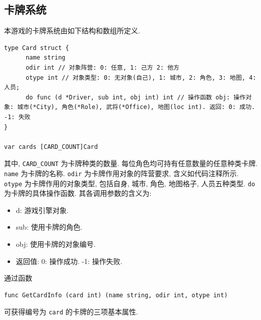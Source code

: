 \documentclass[UTF8, zihao=-4]{ctexart} %
\newcommand{\lcode}{\lstinline} % 段内插入代码
\begin{document}
\subsection{卡牌系统}
\label{s_card}
本游戏的卡牌系统由如下结构和数组所定义.
\begin{lstlisting}
type Card struct {
      name string
      odir int // 对象阵营: 0: 任意, 1: 己方 2: 他方
      otype int // 对象类型: 0: 无对象(自己), 1: 城市, 2: 角色, 3: 地图, 4: 人员;
      do func (d *Driver, sub int, obj int) int // 操作函数 obj: 操作对象: 城市(*City), 角色(*Role), 武将(*Office), 地图(loc int). 返回: 0: 成功. -1: 失败
}

var cards [CARD_COUNT]Card
\end{lstlisting}
其中, \lcode{CARD_COUNT} 为卡牌种类的数量. 每位角色均可持有任意数量的任意种类卡牌.
\lcode{name} 为卡牌的名称. \lcode{odir} 为卡牌作用对象的阵营要求, 含义如代码注释所示.
\lcode{otype} 为卡牌作用的对象类型, 包括自身, 城市, 角色, 地图格子, 人员五种类型.
\lcode{do} 为卡牌的具体操作函数. 其各调用参数的含义为:
\begin{itemize}
    \item d: 游戏引擎对象.
    \item sub: 使用卡牌的角色.
    \item obj: 使用卡牌的对象编号.
    \item 返回值: 0: 操作成功. -1: 操作失败.
\end{itemize}
通过函数
\begin{lstlisting}
func GetCardInfo (card int) (name string, odir int, otype int) 
\end{lstlisting}
可获得编号为 \lcode{card} 的卡牌的三项基本属性.
\end{document}
